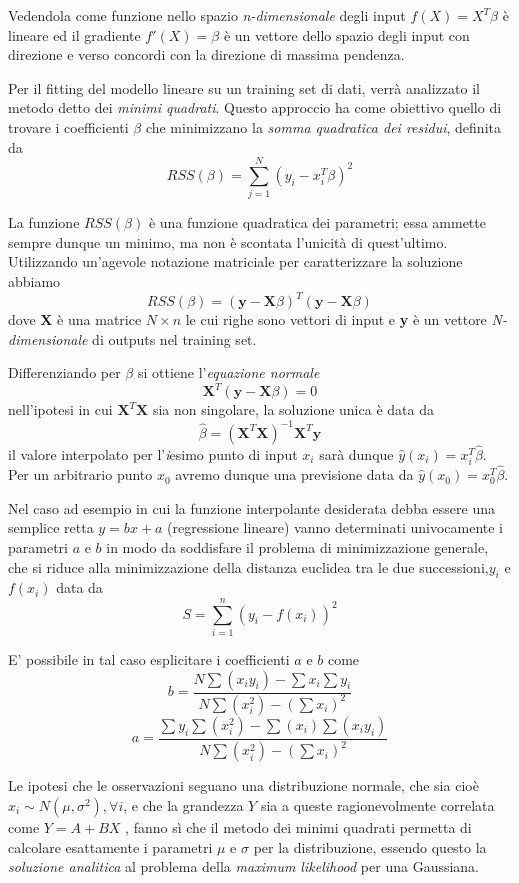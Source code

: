 \documentclass[a4paper]{report}
\begin{document}
Vedendola come funzione nello spazio \textit{n-dimensionale} degli input $f(X)=X^T\beta$ è lineare ed il gradiente $f'(X)=\beta$ è un vettore dello spazio degli input con direzione e verso concordi con la direzione di massima pendenza.

Per il fitting del modello lineare su un training set di dati, verrà analizzato il metodo detto dei \textit{minimi quadrati}.
Questo approccio ha come obiettivo quello di trovare i coefficienti $\beta$ che minimizzano la \textit{somma quadratica dei residui}, definita da \[RSS(\beta)=\sum_{j=1}^{N}(y_i-x_i^T\beta)^2\]

La funzione $RSS(\beta)$ è una funzione quadratica dei parametri; essa ammette sempre dunque un minimo, ma non è scontata l'unicità di quest'ultimo.
Utilizzando un'agevole notazione matriciale per caratterizzare la soluzione abbiamo
\[RSS(\beta)=(\textbf{y}-\textbf{X}\beta)^T(\textbf{y}-\textbf{X}\beta)\]
dove \textbf{X} è una matrice $N \times n$ le cui righe sono vettori di input e \textbf{y} è un vettore \textit{N-dimensionale} di outputs nel training set.

Differenziando per $\beta$ si ottiene l'\textit{equazione normale}
\[\textbf{X}^T(\textbf{y}-\textbf{X}\beta)=0\]
nell'ipotesi in cui $\textbf{X}^T\textbf{X}$ sia non singolare, la soluzione unica è data da
\[\hat{\beta}=(\textbf{X}^T\textbf{X})^{-1}\textbf{X}^T\textbf{y}\]
il valore interpolato per l'\textit{i}esimo punto di input $x_i$ sarà dunque $\hat{y}(x_i)=x_i^T\hat{\beta}$. Per un arbitrario punto $x_0$ avremo dunque una previsione data da $\hat{y}(x_0)=x_0^T\hat{\beta}$.

Nel caso ad esempio in cui la funzione interpolante desiderata debba essere una semplice retta $y=bx+a$ (regressione lineare) vanno determinati univocamente i parametri $a$ e $b$ in modo da soddisfare il problema di minimizzazione generale, che si riduce alla minimizzazione della distanza euclidea tra le due successioni,$y_i$ e $f(x_i)$ data da 
\[ S = \sum_{i=1}^n \left(y_i - f(x_i)\right)^2\]

E' possibile in tal caso esplicitare i coefficienti $a$ e $b$ come
\[b=\frac{ N \sum (x_i y_i) - \sum x_i \sum y_i}{N\sum (x_i^2)-(\sum x_i)^2}\]
\[a=\frac{\sum y_i \sum (x_i^2)- \sum (x_i) \sum (x_i y_i)}{N\sum (x_i^2)-(\sum x_i)^2}\]

Le ipotesi che le osservazioni seguano una distribuzione normale, che sia cioè $x_{i}\sim N(\mu,\sigma^{2}), \forall i$, e che la grandezza $Y$ sia a queste ragionevolmente correlata come $Y=A+BX$ , fanno sì che il metodo dei minimi quadrati permetta di calcolare esattamente i parametri $\mu$ e $\sigma$ per la distribuzione, essendo questo la \textit{soluzione analitica} al problema della \textit{maximum likelihood} per una Gaussiana.
\end{document}
